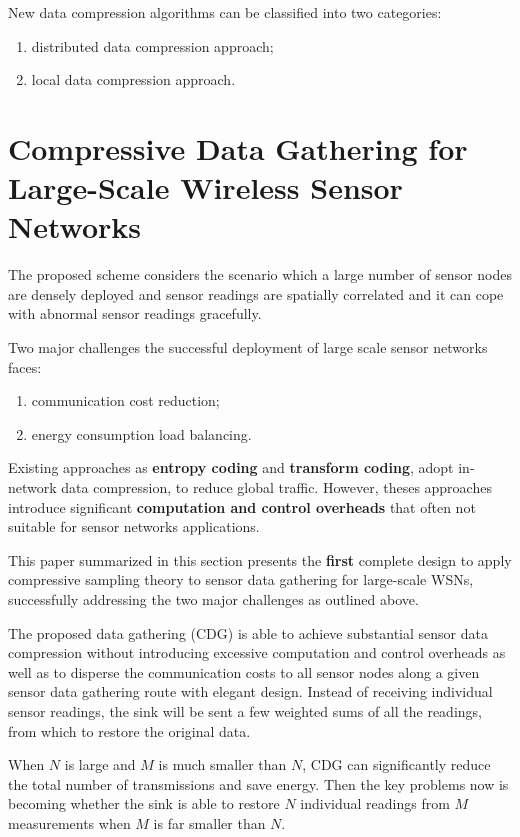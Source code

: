 New data compression algorithms can be classified into two categories:
\begin{enumerate}
    \item distributed data compression approach;
    \item local data compression approach.
\end{enumerate}


\section{Compressive Data Gathering for Large-Scale Wireless Sensor Networks}

The proposed scheme considers the scenario which a large number of sensor nodes are densely deployed and sensor readings are spatially correlated and it can cope with abnormal sensor readings gracefully.

Two major challenges the successful deployment of large scale sensor networks faces:
\begin{enumerate}
    \item communication cost reduction;
    \item energy consumption load balancing.
\end{enumerate}
Existing approaches as \textbf{\textcolor[rgb]{1,0,0}{entropy coding}} and \textbf{\textcolor[rgb]{1,0,0}{transform coding}}, adopt in-network data compression, to reduce global traffic. However, theses approaches introduce significant \textbf{\textcolor[rgb]{0,0,1}{computation and control overheads}} that often not suitable for sensor networks applications.

This paper summarized in this section presents the \textbf{\textcolor[rgb]{1,0,0}{first}} complete design to apply compressive sampling theory to sensor data gathering for large-scale WSNs, successfully addressing the two major challenges as outlined above. 

The proposed data gathering (CDG) is able to achieve substantial sensor data compression without introducing excessive computation and control overheads as well as to disperse the communication costs to all sensor nodes along a given sensor data gathering route with elegant design. Instead of receiving individual sensor readings, the sink will be sent a few weighted sums of all the readings, from which to restore the original data. 

When $N$ is large and $M$ is much smaller than $N$, CDG can significantly reduce the total number of transmissions and save energy. Then the key problems now is becoming whether the sink is able to restore $N$ individual readings from $M$ measurements when $M$ is far smaller than $N$. 

